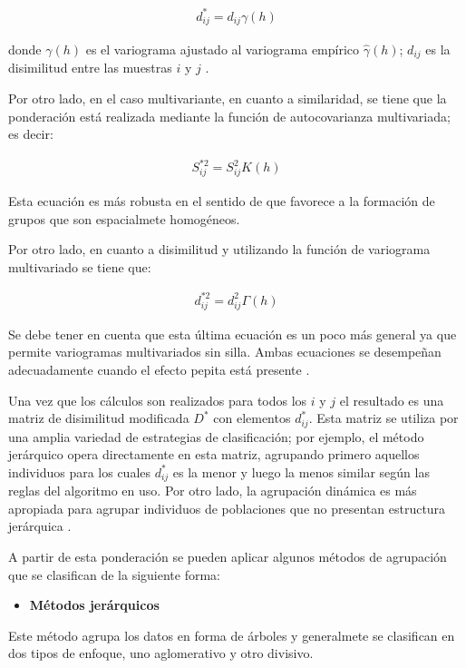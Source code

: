 \documentclass[
]{book}
\providecommand{\tightlist}{%
  \setlength{\itemsep}{0pt}\setlength{\parskip}{0pt}}
\begin{document}
\begin{align*}
    d_{ij}^*=d_{ij}\gamma(h)
\end{align*}

donde \(\gamma(h)\) es el variograma ajustado al variograma empírico \(\hat{\gamma}(h)\); \(d_{ij}\) es la disimilitud entre las muestras \(i\) y \(j\) \citep{borou}.

Por otro lado, en el caso multivariante, en cuanto a similaridad, se tiene que la ponderación está realizada mediante la función de autocovarianza multivariada; es decir:

\begin{align*}
    S^{*2}_{ij}=S_{ij}^2K(h)
\end{align*}

Esta ecuación es más robusta en el sentido de que favorece a la formación de grupos que son espacialmete homogéneos.

Por otro lado, en cuanto a disimilitud y utilizando la función de variograma multivariado se tiene que:

\begin{align*}
    d_{ij}^{*2}=d_{ij}^2\Gamma(h)
\end{align*}

Se debe tener en cuenta que esta última ecuación es un poco más general ya que permite variogramas multivariados sin silla. Ambas ecuaciones se desempeñan adecuadamente cuando el efecto pepita está presente \citep{borou}.

Una vez que los cálculos son realizados para todos los \(i\) y \(j\) el resultado es una matriz de disimilitud modificada \(D^*\) con elementos \(d_{ij}^*\). Esta matriz se utiliza por una amplia variedad de estrategias de clasificación; por ejemplo, el método jerárquico opera directamente en esta matriz, agrupando primero aquellos individuos para los cuales \(d_{ij}^*\) es la menor y luego la menos similar según las reglas del algoritmo en uso. Por otro lado, la agrupación dinámica es más apropiada para agrupar individuos de poblaciones que no presentan estructura jerárquica \citep{oliver}.

A partir de esta ponderación se pueden aplicar algunos métodos de agrupación que se clasifican de la siguiente forma:

\begin{itemize}
\tightlist
\item
  \textbf{Métodos jerárquicos}
\end{itemize}

Este método agrupa los datos en forma de árboles y generalmete se clasifican en dos tipos de enfoque, uno aglomerativo y otro divisivo.
\end{document}
